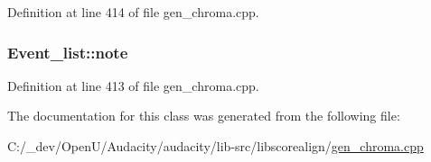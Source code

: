 Definition at line 414 of file gen\+\_\+chroma.\+cpp.

\subsubsection[{\texorpdfstring{note}{note}}]{ Event\+\_\+list\+::note}\hypertarget{class_event__list_a9a08b25f82f30b67a9c72549365075a9}{}\label{class_event__list_a9a08b25f82f30b67a9c72549365075a9}


Definition at line 413 of file gen\+\_\+chroma.\+cpp.



The documentation for this class was generated from the following file\+:\begin{DoxyCompactItemize}
\item 
C\+:/\+\_\+dev/\+Open\+U/\+Audacity/audacity/lib-\/src/libscorealign/\hyperlink{gen__chroma_8cpp}{gen\+\_\+chroma.\+cpp}\end{DoxyCompactItemize}
